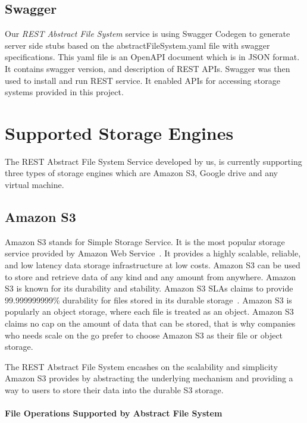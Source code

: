 \subsection{Swagger}

Our \emph{REST Abstract File System} service is using Swagger Codegen
to generate server side stubs based on the abstractFileSystem.yaml
file with swagger specifications.  This yaml file is an OpenAPI
document which is in JSON format.  It contains swagger version, and
description of REST APIs.  Swagger was then used to install and run
REST service. It enabled APIs for accessing storage systems provided
in this project.

\section{Supported Storage Engines}

The REST Abstract File System Service developed by us, is currently
supporting three types of storage engines which are Amazon S3, Google
drive and any virtual machine. 

\subsection{Amazon S3}

Amazon S3 stands for Simple Storage Service. It is the most popular
storage service provided by Amazon Web
Service~\cite{hid-sp18-420-amazon-S3}. It provides a highly scalable,
reliable, and low latency data storage infrastructure at low
costs. Amazon S3 can be used to store and retrieve data of any kind
and any amount from anywhere. Amazon S3 is known for its durability
and stability. Amazon S3 SLAs claims to provide 99.999999999\%
durability for files stored in its durable
storage~\cite{hid-sp18-420-amazon-S3}. Amazon S3 is popularly an
object storage, where each file is treated as an object. Amazon S3
claims no cap on the amount of data that can be stored, that is why
companies who needs scale on the go prefer to choose Amazon S3 as
their file or object storage.

The REST Abstract File System encashes on the scalability and
simplicity Amazon S3 provides by abstracting the underlying mechanism
and providing a way to users to store their data into the durable S3
storage.

\paragraph{File Operations Supported by Abstract File System}


